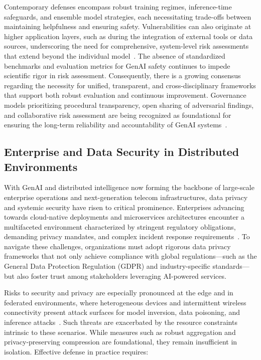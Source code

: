 Contemporary defenses encompass robust training regimes, inference-time safeguards, and ensemble model strategies, each necessitating trade-offs between maintaining helpfulness and ensuring safety. Vulnerabilities can also originate at higher application layers, such as during the integration of external tools or data sources, underscoring the need for comprehensive, system-level risk assessments that extend beyond the individual model~\cite{ref3}. The absence of standardized benchmarks and evaluation metrics for GenAI safety continues to impede scientific rigor in risk assessment. Consequently, there is a growing consensus regarding the necessity for unified, transparent, and cross-disciplinary frameworks that support both robust evaluation and continuous improvement. Governance models prioritizing procedural transparency, open sharing of adversarial findings, and collaborative risk assessment are being recognized as foundational for ensuring the long-term reliability and accountability of GenAI systems~\cite{ref3,ref7}.

\subsection{Enterprise and Data Security in Distributed Environments}

With GenAI and distributed intelligence now forming the backbone of large-scale enterprise operations and next-generation telecom infrastructures, data privacy and systemic security have risen to critical prominence. Enterprises advancing towards cloud-native deployments and microservices architectures encounter a multifaceted environment characterized by stringent regulatory obligations, demanding privacy mandates, and complex incident response requirements~\cite{ref17,ref18,ref19}. To navigate these challenges, organizations must adopt rigorous data privacy frameworks that not only achieve compliance with global regulations---such as the General Data Protection Regulation (GDPR) and industry-specific standards---but also foster trust among stakeholders leveraging AI-powered services.

Risks to security and privacy are especially pronounced at the edge and in federated environments, where heterogeneous devices and intermittent wireless connectivity present attack surfaces for model inversion, data poisoning, and inference attacks~\cite{ref17,ref19,ref23,ref24}. Such threats are exacerbated by the resource constraints intrinsic to these scenarios. While measures such as robust aggregation and privacy-preserving compression are foundational, they remain insufficient in isolation. Effective defense in practice requires:

